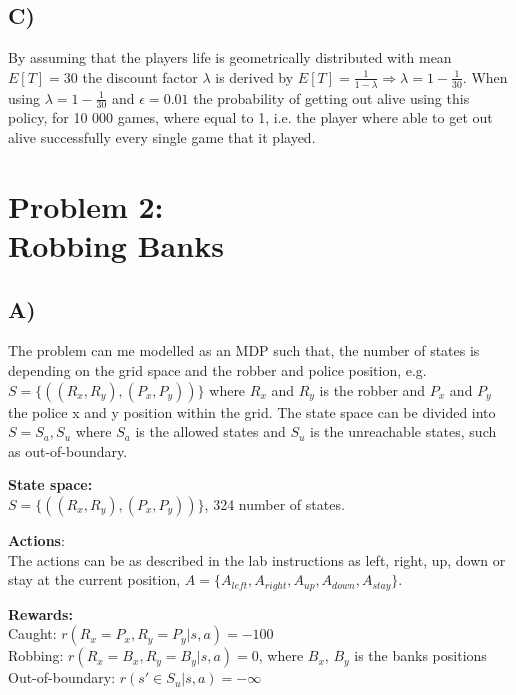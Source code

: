 \documentclass{article}
\begin{document}
\subsection*{C)}
By assuming that the players life is geometrically distributed with mean $E[T] = 30$ the discount factor $\lambda$ is derived by $E[T] =  \frac{1}{1 - \lambda} \Rightarrow \lambda = 1 - \frac{1}{30}$. When using $\lambda = 1 - \frac{1}{30}$ and $\epsilon = 0.01$ the probability of getting out alive using this policy, for 10 000 games, where equal to 1, i.e. the player where able to get out alive successfully every single game that it played.



\pagebreak





\section*{Problem 2: \\
        Robbing Banks}
        
        
\subsection*{A)}
The problem can me modelled as an MDP such that, the number of states is depending on the grid space and the robber and police position, e.g. $S = \{((R_x, R_y),(P_x, P_y) )\} $ where $R_x$ and $R_y$ is the robber and $P_x$ and $P_y$ the police x and y position within the grid. The state space can be divided into $S = {S_a, S_u}$ where $S_a$ is the allowed states and $S_u$ is the unreachable states, such as out-of-boundary.


\textbf{State space:}\\
$S = \{((R_x, R_y),(P_x, P_y) )\} $, 324 number of states. 

\textbf{Actions}: \\
The actions can be as described in the lab instructions as left, right, up, down or stay at the current position, $A = \{ A_{left}, A_{right}, A_{up}, A_{down}, A_{stay} \}$. 

\textbf{Rewards:} \\
Caught: $r(R_x = P_x , R_y = P_y |s,a) = -100 $\\ 
Robbing: $r(R_x = B_x , R_y = B_y |s,a) = 0 $, where $B_x$, $B_y$ is the banks positions\\
Out-of-boundary: $r(s'\in S_u |s,a) = -\infty $
\end{document}
